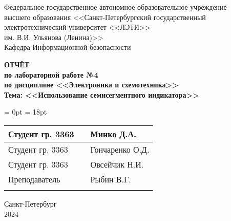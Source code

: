  \thispagestyle{empty}

\begin{center}
	Федеральное государственное автономное образовательное учреждение \\
	высшего образования <<Санкт-Петербургский государственный \\ 
	электротехнический университет <<ЛЭТИ>> \\
	им. В.И. Ульянова (Ленина)>>\\
	Кафедра Информационной безопасности\\
\end{center}

\vfill

\begin{center}
	
	{\bfseries ОТЧЁТ \\
	по лабораторной работе №4\\
	по дисциплине <<Электроника и схемотехника>>\\
	Тема: <<Использование семисегментного индикатора>>}
\end{center}

\vfill

\begin{table}[H]
	\tabcolsep = 0pt
	\extrarowheight = 18pt
	\begin{tabularx}{\textwidth}{>{\raggedright\arraybackslash}b{6.3cm}>{\raggedright\arraybackslash}b{4.6cm}>{\centering\arraybackslash}X}
		Студент гр. 3363&&Минко Д.А.\\ \cline{2-2}
		Студент гр. 3363&&Гончаренко О.Д.\\ \cline{2-2}
		Студент гр. 3363&&Овсейчик Н.И.\\ \cline{2-2}
		Преподаватель&&Рыбин В.Г.\\ \cline{2-2}
	\end{tabularx}
\end{table}

\begin{center}
	Санкт-Петербург \\ 2024
\end{center}

